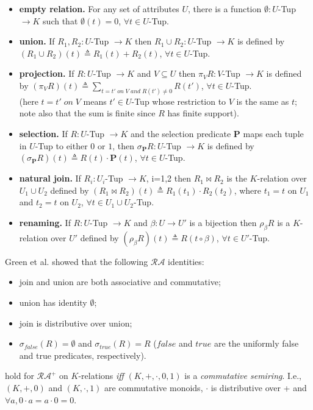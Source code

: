\begin{itemize}
    \item \textbf{empty relation.} For any set of attributes $U$, there is a function $\emptyset : U$-Tup $ \rightarrow K$ such that $\emptyset(t) = 0$, $\forall t \in U$-Tup.
    \item \textbf{union.} If $R_1, R_2 : U$-Tup $ \rightarrow K$ then $R_1 \cup R_2 : U$-Tup $ \rightarrow K$ is defined by $(R_1 \cup R_2)(t) \triangleq R_1(t) + R_2(t)$, $\forall t \in U$-Tup.
    \item \textbf{projection.} If $R : U$-Tup $ \rightarrow K$ and $V \subseteq U$ then $\pi_VR : V$-Tup $ \rightarrow K$ is defined by $(\pi_VR)(t) \triangleq \sum\limits_{t=t'\;on\;V\;and\;R(t') \neq 0}R(t')$, $\forall t \in U$-Tup.\\
    (here $t=t'\;on\;V$ means $t' \in U$-Tup whose restriction to $V$ is the same as $t$; note also that the sum is finite since $R$ has finite support).
    \item \textbf{selection.} If $R : U$-Tup $ \rightarrow K$ and the selection predicate \textbf{P} maps each tuple in $U$-Tup to either $0$ or $1$, then $\sigma_\textbf{P}R : U$-Tup $ \rightarrow K$ is defined by $(\sigma_\textbf{P}R)(t) \triangleq R(t) \cdot \textbf{P}(t)$, $\forall t \in U$-Tup.
    \item \textbf{natural join.} If $R_i : U_i$-Tup $ \rightarrow K$, i=1,2 then $R_1 \bowtie R_2$ is the $K$-relation over $U_1 \cup U_2$ defined by $(R_1 \bowtie R_2)(t) \triangleq R_1(t_1) \cdot R_2(t_2)$, where $t_1=t$ on $U_1$ and $t_2 = t$ on $U_2$, $\forall t \in U_1 \cup U_2$-Tup.
    \item \textbf{renaming.} If $R : U$-Tup $ \rightarrow K$ and $\beta : U \rightarrow U'$ is a bijection then $\rho_\beta R$ is a $K$-relation over $U'$ defined by $(\rho_\beta R)(t) \triangleq R(t \circ \beta)$, $\forall t \in U'$-Tup.
\end{itemize}
Green et al. \cite{green2007provenance} showed that the following $\mathcal{RA}$ identities:
\begin{itemize}
    \item join and union are both associative and commutative;
    \item union has identity $\emptyset$;
    \item join is distributive over union;
    \item $\sigma_{false}(R) = \emptyset$ and $\sigma_{true}(R) = R$ ($false$ and $true$ are the uniformly false and true predicates, respectively).
\end{itemize}
hold for $\mathcal{RA^+}$ on $K$-relations \textit{iff} $(K,+,\cdot,0,1)$ is a \textit{commutative semiring}.
I.e., $(K,+,0)$ and $(K,\cdot,1)$ are commutative monoids\footnotemark,
$\cdot$ is distributive over + and $\forall a, 0 \cdot a = a \cdot 0 = 0$.

